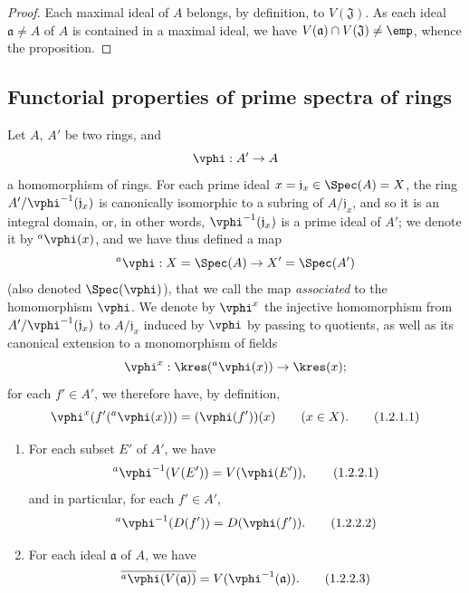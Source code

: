 \begin{proof}
Each maximal ideal of $A$ belongs, by definition, to $V(\mathfrak{J})$.
As each ideal $\mathfrak{a}\neq A$ of $A$ is contained in a maximal ideal, we have $V(\mathfrak{a})\cap V(\mathfrak{J})\neq\emp$, whence the proposition.
\end{proof}

\subsection{Functorial properties of prime spectra of rings}
\label{subsection:I.1.2}

\begin{env}[1.2.1]
\label{I.1.2.1}
Let $A$, $A'$ be two rings, and
\[
  \vphi:A'\to A
\]
a homomorphism of rings.
For each prime ideal $x=\mathfrak{j}_x\in\Spec(A)=X$, the ring $A'/\vphi^{-1}(\mathfrak{j}_x)$ is canonically isomorphic to a subring of $A/\mathfrak{j}_x$, and so it is an integral domain, or, in other words, $\vphi^{-1}(\mathfrak{j}_x)$ is a prime ideal of $A'$;
we denote it by ${}^a\vphi(x)$, and we have thus defined a map
\[
  {}^a\vphi:X=\Spec(A)\to X'=\Spec(A')
\]
(also denoted $\Spec(\vphi)$), that we call the map \emph{associated} to the homomorphism $\vphi$.
We denote by $\vphi^x$ the injective homomorphism from $A'/\vphi^{-1}(\mathfrak{j}_x)$ to $A/\mathfrak{j}_x$ induced by $\vphi$ by passing to quotients, as well as its canonical extension to a monomorphism of fields
\[
  \vphi^x:\kres({}^a\vphi(x))\to\kres(x);
\]
for each $f'\in A'$, we therefore have, by definition,
\[
  \label{I.1.2.1.1}
  \vphi^x(f'({}^a\vphi(x)))=(\vphi(f'))(x)\qquad(x\in X).
  \tag{1.2.1.1}
\]
\end{env}

\begin{proposition}[1.2.2]
\label{I.1.2.2}
\medskip\noindent
\begin{enumerate}
  \item[{\rm(i)}] For each subset $E'$ of $A'$, we have
    \[
    \label{I.1.2.2.1}
      {}^a\vphi^{-1}(V(E'))=V(\vphi(E')),
      \tag{1.2.2.1}
    \]
    and in particular, for each $f'\in A'$,
    \[
    \label{I.1.2.2.2}
      {}^a\vphi^{-1}(D(f'))=D(\vphi(f')).
      \tag{1.2.2.2}
    \]
  \item[{\rm(ii)}] For each ideal $\mathfrak{a}$ of $A$, we have
    \[
    \label{I.1.2.2.3}
      \overline{{}^a\vphi(V(\mathfrak{a}))}=V(\vphi^{-1}(\mathfrak{a})).
      \tag{1.2.2.3}
    \]
\end{enumerate}
\end{proposition}


